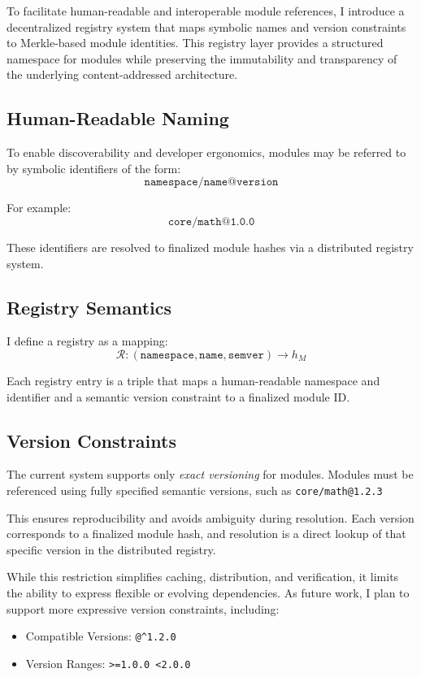 \documentclass[sigplan,screen]{acmart}
\begin{document}
To facilitate human-readable and interoperable module references, I introduce a decentralized registry system that maps symbolic names and version constraints to Merkle-based module identities. This registry layer provides a structured namespace for modules while preserving the immutability and transparency of the underlying content-addressed architecture.

\subsection{Human-Readable Naming}

To enable discoverability and developer ergonomics, modules may be referred to by symbolic identifiers of the form:
\[
	\texttt{namespace/name@version}
\]

For example:
\[
	\texttt{core/math@1.0.0}
\]

These identifiers are resolved to finalized module hashes via a distributed registry system.

\subsection{Registry Semantics}

I define a registry as a mapping:
\[
	\mathcal{R}: (\texttt{namespace}, \texttt{name}, \texttt{semver}) \rightarrow h_M
\]

Each registry entry is a triple that maps a human-readable namespace and identifier and a semantic version constraint to a finalized module ID.

\subsection{Version Constraints}

The current system supports only \emph{exact versioning} for modules. Modules must be referenced using fully specified semantic versions, such as \texttt{core/math@1.2.3}

This ensures reproducibility and avoids ambiguity during resolution. Each version corresponds to a finalized module hash, and resolution is a direct lookup of that specific version in the distributed registry.

While this restriction simplifies caching, distribution, and verification, it limits the ability to express flexible or evolving dependencies. As future work, I plan to support more expressive version constraints, including:

\begin{itemize}
	\item Compatible Versions: \verb#@^1.2.0#
	\item Version Ranges: \texttt{>=1.0.0 <2.0.0}
\end{itemize}
\end{document}
